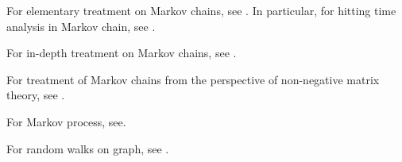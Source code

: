 \begin{refsection}
For elementary treatment on Markov chains, see \cite{privault2013understanding}\cite{Holmes-Cerfon2015applied}\cite{luenberger1979introduction}. In particular, for hitting time analysis in Markov chain, see \cite{privault2013understanding}.

For in-depth treatment on Markov chains, see \cite{gallager2013stochastic}\cite{sericola2013markov}\cite{He2007stochastic}.

For treatment of Markov chains from the perspective of non-negative matrix theory, see \cite{seneta2006non}.

For Markov process, see\cite{pavliotis2014stochastic}.

For random walks on graph, see \cite{lovasz1993random}.

\printbibliography
\end{refsection}
